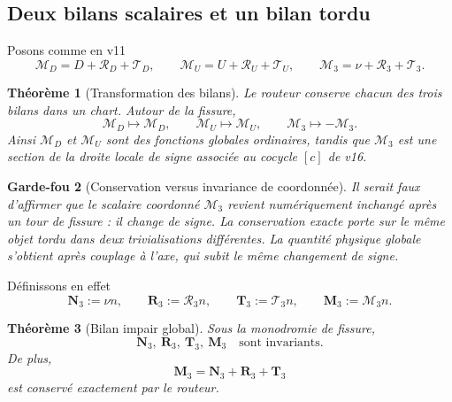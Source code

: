 \documentclass[11pt,a4paper]{article}
\newtheorem{theorem}{Théorème}[section]
\newtheorem{guardrail}[theorem]{Garde-fou}
\begin{document}
\subsection{Deux bilans scalaires et un bilan tordu}

Posons comme en v11
\begin{equation}\label{eq:v17-ledgers}
 \mathcal M_D=D+\mathscr R_D+\mathscr T_D,
 \qquad
 \mathcal M_U=U+\mathscr R_U+\mathscr T_U,
 \qquad
 \mathcal M_3=\nu+\mathscr R_3+\mathscr T_3.
\end{equation}

\begin{theorem}[Transformation des bilans]\label{thm:v17-ledger-parity}
Le routeur conserve chacun des trois bilans dans un chart. Autour de la fissure,
\begin{equation}\label{eq:v17-ledger-parity}
 \boxed{
 \mathcal M_D\mapsto\mathcal M_D,
 \qquad
 \mathcal M_U\mapsto\mathcal M_U,
 \qquad
 \mathcal M_3\mapsto-\mathcal M_3.}
\end{equation}
Ainsi $\mathcal M_D$ et $\mathcal M_U$ sont des fonctions globales ordinaires, tandis que $\mathcal M_3$ est une section de la droite locale de signe associée au cocycle $[c]$ de v16.
\end{theorem}

\begin{guardrail}[Conservation versus invariance de coordonnée]
Il serait faux d'affirmer que le scalaire coordonné $\mathcal M_3$ revient numériquement inchangé après un tour de fissure : il change de signe. La conservation exacte porte sur le même objet tordu dans deux trivialisations différentes. La quantité physique globale s'obtient après couplage à l'axe, qui subit le même changement de signe.
\end{guardrail}

Définissons en effet
\begin{equation}\label{eq:v17-global-odd-vectors}
 \boxed{
 \mathbf N_3:=\nu n,
 \qquad
 \mathbf R_3:=\mathscr R_3 n,
 \qquad
 \mathbf T_3:=\mathscr T_3 n,
 \qquad
 \mathbf M_3:=\mathcal M_3 n.}
\end{equation}

\begin{theorem}[Bilan impair global]\label{thm:v17-global-odd-ledger}
Sous la monodromie de fissure,
\begin{equation}\label{eq:v17-global-odd-ledger}
 \boxed{
 \mathbf N_3,\ \mathbf R_3,\ \mathbf T_3,\ \mathbf M_3
 \quad\text{sont invariants}.}
\end{equation}
De plus,
\[
 \boxed{
 \mathbf M_3
 =\mathbf N_3+\mathbf R_3+\mathbf T_3}
\]
est conservé exactement par le routeur.
\end{theorem}
\end{document}
